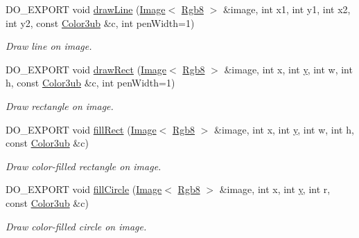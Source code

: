 \begin{DoxyCompactItemize}
D\-O\-\_\-\-E\-X\-P\-O\-R\-T void \hyperlink{group___image_drawing_ga451047caac18dd6bfb59bdc9b983eed1}{draw\-Line} (\hyperlink{class_d_o_1_1_image}{Image}$<$ \hyperlink{group___color_types_gabba376766e70e08cdaccf69fa903f526}{Rgb8} $>$ \&image, int x1, int y1, int x2, int y2, const \hyperlink{group___color_types_ga018b76cd00a4f9dca7dd06246d5bd3aa}{Color3ub} \&c, int pen\-Width=1)
\begin{DoxyCompactList}\small\item\em Draw line on image. \end{DoxyCompactList}\item 
D\-O\-\_\-\-E\-X\-P\-O\-R\-T void \hyperlink{group___image_drawing_ga6c2140a7a5e0cf130a3dd51abe4376ad}{draw\-Rect} (\hyperlink{class_d_o_1_1_image}{Image}$<$ \hyperlink{group___color_types_gabba376766e70e08cdaccf69fa903f526}{Rgb8} $>$ \&image, int x, int \hyperlink{group___channel_accessors_gac90c52c5b3a7b2a7e3761e6e84f25778}{y}, int w, int h, const \hyperlink{group___color_types_ga018b76cd00a4f9dca7dd06246d5bd3aa}{Color3ub} \&c, int pen\-Width=1)
\begin{DoxyCompactList}\small\item\em Draw rectangle on image. \end{DoxyCompactList}\item 
D\-O\-\_\-\-E\-X\-P\-O\-R\-T void \hyperlink{group___image_drawing_gafe36fdf2a8b63bc7fd18457c28064346}{fill\-Rect} (\hyperlink{class_d_o_1_1_image}{Image}$<$ \hyperlink{group___color_types_gabba376766e70e08cdaccf69fa903f526}{Rgb8} $>$ \&image, int x, int \hyperlink{group___channel_accessors_gac90c52c5b3a7b2a7e3761e6e84f25778}{y}, int w, int h, const \hyperlink{group___color_types_ga018b76cd00a4f9dca7dd06246d5bd3aa}{Color3ub} \&c)
\begin{DoxyCompactList}\small\item\em Draw color-\/filled rectangle on image. \end{DoxyCompactList}\item 
D\-O\-\_\-\-E\-X\-P\-O\-R\-T void \hyperlink{group___image_drawing_gae92bc8aef0c29edc577c531d505b04bb}{fill\-Circle} (\hyperlink{class_d_o_1_1_image}{Image}$<$ \hyperlink{group___color_types_gabba376766e70e08cdaccf69fa903f526}{Rgb8} $>$ \&image, int x, int \hyperlink{group___channel_accessors_gac90c52c5b3a7b2a7e3761e6e84f25778}{y}, int r, const \hyperlink{group___color_types_ga018b76cd00a4f9dca7dd06246d5bd3aa}{Color3ub} \&c)
\begin{DoxyCompactList}\small\item\em Draw color-\/filled circle on image. \end{DoxyCompactList}\item 

\end{DoxyCompactItemize}
